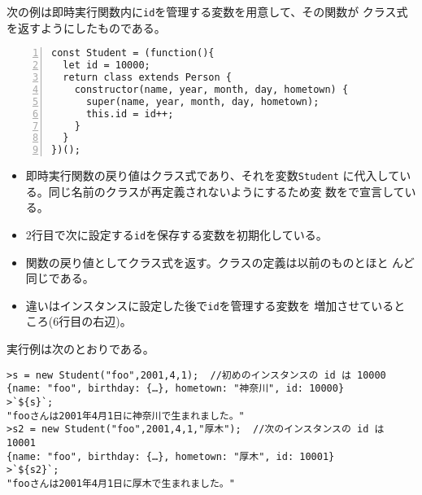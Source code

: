 \begin{Exec}\upshape
次の例は即時実行関数内に\texttt{id}を管理する変数を用意して、その関数が
 クラス式を返すようにしたものである。
\begin{Verbatim}[numbers=left]
const Student = (function(){
  let id = 10000;
  return class extends Person {
    constructor(name, year, month, day, hometown) {
      super(name, year, month, day, hometown);
      this.id = id++;
    }
  }
})();
\end{Verbatim}
 \begin{itemize}
  \item 即時実行関数の戻り値はクラス式であり、それを変数\texttt{Student}
        に代入している。同じ名前のクラスが再定義されないようにするため変
        数をで宣言している。
  \item 2行目で次に設定する\texttt{id}を保存する変数を初期化している。
  \item 関数の戻り値としてクラス式を返す。クラスの定義は以前のものとほと
        んど同じである。
  \item 違いはインスタンスに設定した後で\texttt{id}を管理する変数を
        増加させているところ(6行目の右辺)。
 \end{itemize}
 実行例は次のとおりである。
\begin{Verbatim}
>s = new Student("foo",2001,4,1);  //初めのインスタンスの id は 10000
{name: "foo", birthday: {…}, hometown: "神奈川", id: 10000}
>`${s}`;
"fooさんは2001年4月1日に神奈川で生まれました。"
>s2 = new Student("foo",2001,4,1,"厚木");  //次のインスタンスの id は 10001
{name: "foo", birthday: {…}, hometown: "厚木", id: 10001}
>`${s2}`;
"fooさんは2001年4月1日に厚木で生まれました。"
\end{Verbatim}
\end{Exec}
